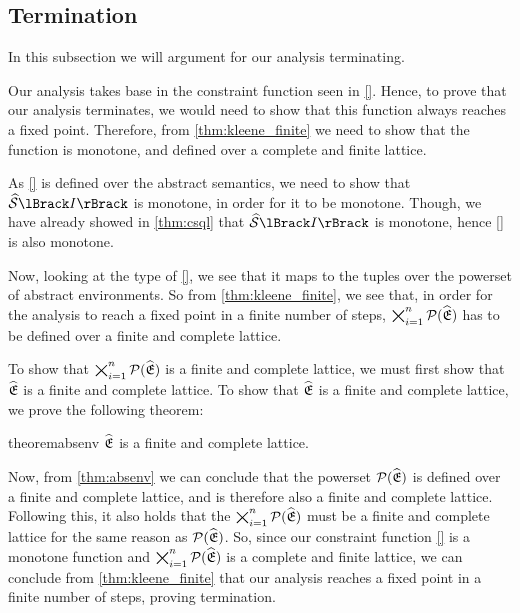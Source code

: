 \subsection{Termination}\label{subsec:termination}

In this subsection we will argument for our analysis terminating.

Our analysis takes base in the constraint function seen in \autoref{}.
Hence, to prove that our analysis terminates, we would need to show that this function always reaches a fixed point.
Therefore, from \autoref{thm:kleene_finite} we need to show that the function is monotone, and defined over a complete and finite lattice.

As \autoref{}  is defined over the abstract semantics, we need to show that $\abssem{I}$ is monotone, in order for it to be monotone.
Though, we have already showed in \autoref{thm:csql} that $\abssem{I}$ is monotone, hence \autoref{}  is also monotone.

Now, looking at the type of \autoref{}, we see that it maps to the tuples over the powerset of abstract environments.
So from \autoref{thm:kleene_finite}, we see that, in order for the analysis to reach a fixed point in a finite number of steps, $\bigtimes_{i = 1}^n \mathcal{P}(\widehat{\mathfrak{E}})$ has to be defined over a finite and complete lattice.

To show that $\bigtimes_{i = 1}^n \mathcal{P}(\widehat{\mathfrak{E}})$ is a finite and complete lattice, we must first show that $\widehat{\mathfrak{E}}$ is a finite and complete lattice.
To show that $\widehat{\mathfrak{E}}$ is a finite and complete lattice, we prove the following theorem:

\begin{restatable}{theorem}{absenv}\label{thm:absenv}
$\widehat{\mathfrak{E}}$ is a finite and complete lattice.
\end{restatable}

Now, from \autoref{thm:absenv} we can conclude that the powerset $\mathcal{P}(\widehat{\mathfrak{E}})$ is defined over a finite and complete lattice, and is therefore also a finite and complete lattice.
Following this, it also holds that the $\bigtimes_{i = 1}^n \mathcal{P}(\widehat{\mathfrak{E}})$ must be a finite and complete lattice for the same reason as $\mathcal{P}(\widehat{\mathfrak{E}})$.
So, since our constraint function \autoref{}  is a monotone function and $\bigtimes_{i = 1}^n \mathcal{P}(\widehat{\mathfrak{E}})$ is a complete and finite lattice, we can conclude from \autoref{thm:kleene_finite} that our analysis reaches a fixed point in a finite number of steps, proving termination.